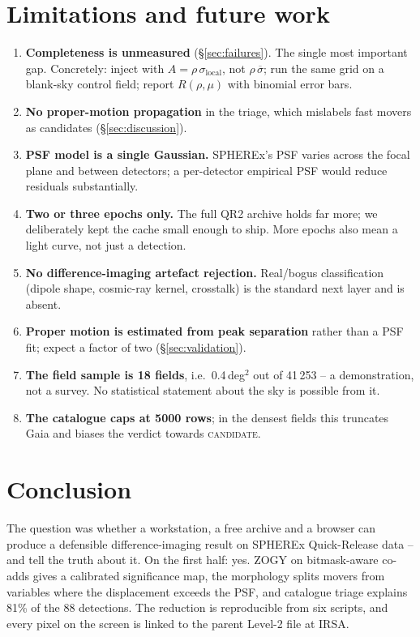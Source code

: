 \documentclass[11pt,a4paper]{article}
\begin{document}
\section{Limitations and future work}
\label{sec:future}

\begin{enumerate}[leftmargin=1.4em,itemsep=3pt]
\item \textbf{Completeness is unmeasured} (\S\ref{sec:failures}). The single most important gap.
      Concretely: inject with $A = \rho\,\sigma_{\mathrm{local}}$, not $\rho\,\overline{\sigma}$; run
      the same grid on a blank-sky control field; report $R(\rho,\mu)$ with binomial error bars.
\item \textbf{No proper-motion propagation} in the triage, which mislabels fast movers as candidates
      (\S\ref{sec:discussion}).
\item \textbf{PSF model is a single Gaussian.} SPHEREx's PSF varies across the focal plane and between
      detectors; a per-detector empirical PSF would reduce residuals substantially.
\item \textbf{Two or three epochs only.} The full QR2 archive holds far more; we deliberately kept the
      cache small enough to ship. More epochs also mean a light curve, not just a detection.
\item \textbf{No difference-imaging artefact rejection.} Real/bogus classification (dipole shape,
      cosmic-ray kernel, crosstalk) is the standard next layer and is absent.
\item \textbf{Proper motion is estimated from peak separation} rather than a PSF fit; expect a factor
      of two (\S\ref{sec:validation}).
\item \textbf{The field sample is 18 fields}, i.e.\ 0.4\,deg$^2$ out of 41\,253 -- a demonstration, not a
      survey. No statistical statement about the sky is possible from it.
\item \textbf{The catalogue caps at 5000 rows}; in the densest fields this truncates Gaia and biases the
      verdict towards \textsc{candidate}.
\end{enumerate}

\section{Conclusion}

The question was whether a workstation, a free archive and a browser can produce a defensible
difference-imaging result on SPHEREx Quick-Release data -- and tell the truth about it. On the first
half: yes. ZOGY on bitmask-aware co-adds gives a calibrated significance map, the morphology splits
movers from variables where the displacement exceeds the PSF, and catalogue triage explains 81\% of the
88 detections. The reduction is reproducible from six scripts, and every pixel on the screen is linked
to the parent Level-2 file at IRSA.
\end{document}
